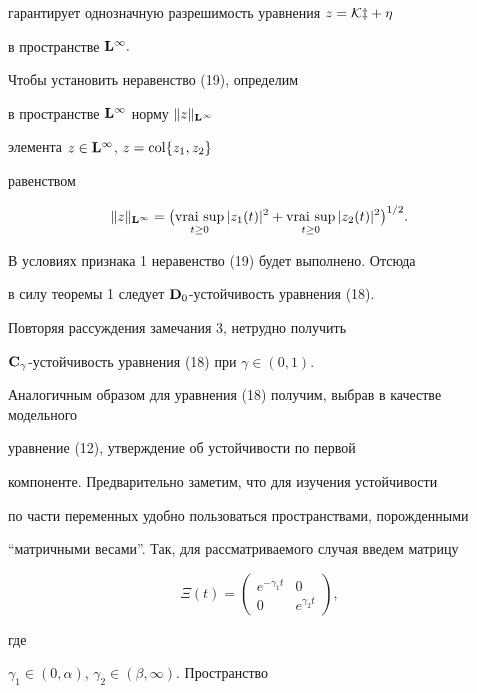 \begin{pf}
гарантирует однозначную разрешимость уравнения $z=\cal Kz +\eta$


в пространстве $\bold L^\infty.$


Чтобы установить неравенство (19), определим


в пространстве $\bold L^\infty$ норму $\|z\|_{\bold L^\infty}$


элемента $z\in\bold L^\infty$, $z=\operatorname{col}\{z_1, z_2\}$


равенством


$$


\|z\|_{\bold L^\infty}=\bigl(\vraisup_{t\ge 0}|z_1(t)|^2 +


\vraisup_{t\ge 0}|z_2(t)|^2\bigr)^{1/2}.


$$


В условиях признака 1 неравенство (19) будет выполнено. Отсюда


в силу теоремы 1 следует $\bold D_0$-устойчивость уравнения (18).


\end{pf}





Повторяя рассуждения замечания 3, нетрудно получить


$\bold C_\gamma$-устойчивость уравнения (18) при $\gamma\in (0,1)$.





Аналогичным образом для уравнения (18) получим, выбрав в качестве модельного


уравнение (12), утверждение об устойчивости по первой


компоненте. Предварительно заметим, что для изучения устойчивости


по части переменных удобно пользоваться пространствами, порожденными


``матричными весами''. Так, для рассматриваемого случая введем матрицу


$$


\Xi(t)=


\begin{pmatrix}


e^{-\gamma_1t} & 0\\


0 & e^{\gamma_2t}


\end{pmatrix},


$$


где


$\gamma_1\in(0,\alpha)$, $\gamma_2\in(\beta,\infty)$. Пространство


